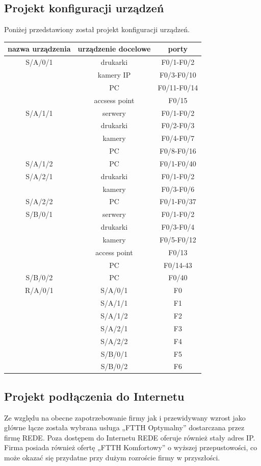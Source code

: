 \documentclass{article}
\begin{document}
\subsection{Projekt konfiguracji urządzeń}
Poniżej przedstawiony został projekt konfiguracji urządzeń.

	\begin{tabular}[!ht]{c|c|c}
	nazwa urządzenia & urządzenie docelowe &porty\\
	\hline	
S/A/0/1 &	drukarki&	F0/1-F0/2\\
&kamery IP	&F0/3-F0/10\\
&PC	&F0/11-F0/14\\
&accsess point&	F0/15\\
\hline

S/A/1/1&	serwery&	F0/1-F0/2\\
&drukarki&	F0/2-F0/3\\
&kamery&	F0/4-F0/7\\
&PC&	F0/8-F0/16\\
\hline

S/A/1/2	&PC&	F0/1-F0/40\\
\hline

S/A/2/1&	drukarki&	F0/1-F0/2\\
&kamery&F0/3-F0/6\\
\hline

S/A/2/2&	PC	&F0/1-F0/37\\
\hline

S/B/0/1	&serwery	&F0/1-F0/2\\
&drukarki&	F0/3-F0/4\\
&kamery	&F0/5-F0/12\\
&access point&	F0/13\\
&PC	&F0/14-43\\
\hline

S/B/0/2	&PC	&F0/40\\
\hline
R/A/0/1&S/A/0/1&F0\\
&S/A/1/1&F1\\
&S/A/1/2&F2\\
&S/A/2/1&F3\\
&S/A/2/2&F4\\
&S/B/0/1&F5\\
&S/B/0/2&F6\\
\hline
\end{tabular}
\subsection{Projekt podłączenia do Internetu}
Ze względu na obecne zapotrzebowanie firmy jak i przewidywany wzrost jako główne łącze została wybrana usługa „FTTH Optymalny” dostarczana przez firmę REDE.  Poza dostępem do Internetu REDE oferuje również stały adres IP. Firma posiada również ofertę „FTTH Komfortowy” o wyższej przepustowości, co może okazać się przydatne przy dużym rozroście firmy w przyszłości.
\end{document}
